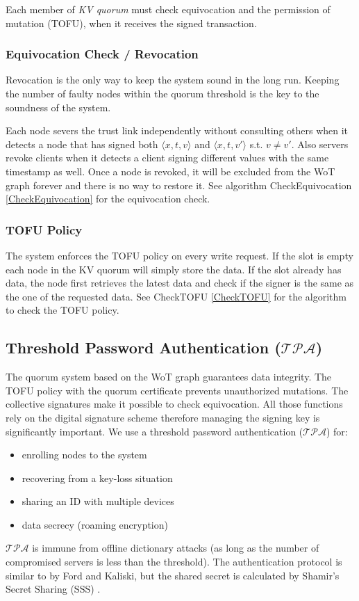 Each member of {\em KV quorum} must check equivocation and the
permission of mutation (TOFU), when it receives the signed
transaction.

\subsubsection*{Equivocation Check / Revocation}
Revocation is the only way to keep the system sound in the long
run. Keeping the number of faulty nodes within the quorum threshold is
the key to the soundness of the system.

Each node severs the trust link independently without consulting
others when it detects a node that has signed both $\langle x,t,v
\rangle$ and $\langle x,t,v' \rangle$ s.t.  $v \neq v'$. Also servers
revoke clients when it detects a client signing different values with
the same timestamp as well. Once a node is revoked, it will be
excluded from the WoT graph forever and there is no way to restore it.
See algorithm {\sf CheckEquivocation} \ref {CheckEquivocation} for
the equivocation check.

\subsubsection*{TOFU Policy}
The system enforces the TOFU policy on every write request. If the
slot is empty each node in the KV quorum will simply store the
data. If the slot already has data, the node first retrieves the
latest data and check if the signer is the same as the one of the
requested data.  See {\sf CheckTOFU} \ref{CheckTOFU} for the
algorithm to check the TOFU policy.

\subsection{Threshold Password Authentication ($\mathcal{TPA}$)}
\label{threshold}
The quorum system based on the WoT graph guarantees data
integrity. The TOFU policy with the quorum certificate prevents
unauthorized mutations. The collective signatures make it possible to
check equivocation. All those functions rely on the digital signature
scheme therefore managing the signing key is significantly
important. We use a threshold password authentication ($\mathcal{TPA}$)
for:
\begin{itemize}
\item enrolling nodes to the system
\item recovering from a key-loss situation
\item sharing an ID with multiple devices
\item data secrecy (roaming encryption)
\end{itemize}
$\mathcal{TPA}$ is immune from offline dictionary attacks (as long as
the number of compromised servers is less than the threshold). The
authentication protocol is similar to \cite{ford} by Ford and Kaliski,
but the shared secret is calculated by Shamir's Secret Sharing (SSS)
\cite{shamir}.\\

